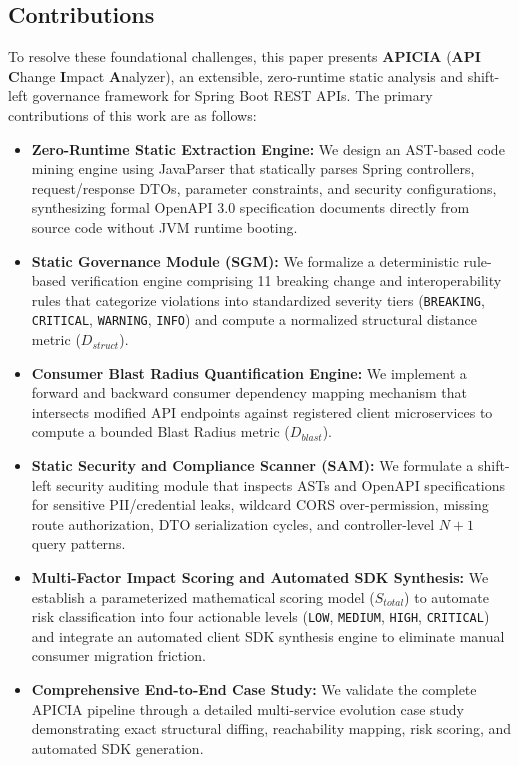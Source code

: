 \documentclass[conference]{IEEEtran}
\begin{document}
\subsection{Contributions}
To resolve these foundational challenges, this paper presents \textbf{APICIA} (\textbf{API} \textbf{C}hange \textbf{I}mpact \textbf{A}nalyzer), an extensible, zero-runtime static analysis and shift-left governance framework for Spring Boot REST APIs. The primary contributions of this work are as follows:
\begin{itemize}
    \item \textbf{Zero-Runtime Static Extraction Engine:} We design an AST-based code mining engine using JavaParser that statically parses Spring controllers, request/response DTOs, parameter constraints, and security configurations, synthesizing formal OpenAPI 3.0 specification documents directly from source code without JVM runtime booting.
    \item \textbf{Static Governance Module (SGM):} We formalize a deterministic rule-based verification engine comprising 11 breaking change and interoperability rules that categorize violations into standardized severity tiers (\texttt{BREAKING}, \texttt{CRITICAL}, \texttt{WARNING}, \texttt{INFO}) and compute a normalized structural distance metric ($D_{struct}$).
    \item \textbf{Consumer Blast Radius Quantification Engine:} We implement a forward and backward consumer dependency mapping mechanism that intersects modified API endpoints against registered client microservices to compute a bounded Blast Radius metric ($D_{blast}$).
    \item \textbf{Static Security and Compliance Scanner (SAM):} We formulate a shift-left security auditing module that inspects ASTs and OpenAPI specifications for sensitive PII/credential leaks, wildcard CORS over-permission, missing route authorization, DTO serialization cycles, and controller-level $N+1$ query patterns.
    \item \textbf{Multi-Factor Impact Scoring and Automated SDK Synthesis:} We establish a parameterized mathematical scoring model ($S_{total}$) to automate risk classification into four actionable levels (\texttt{LOW}, \texttt{MEDIUM}, \texttt{HIGH}, \texttt{CRITICAL}) and integrate an automated client SDK synthesis engine to eliminate manual consumer migration friction.
    \item \textbf{Comprehensive End-to-End Case Study:} We validate the complete APICIA pipeline through a detailed multi-service evolution case study demonstrating exact structural diffing, reachability mapping, risk scoring, and automated SDK generation.
\end{itemize}
\end{document}
